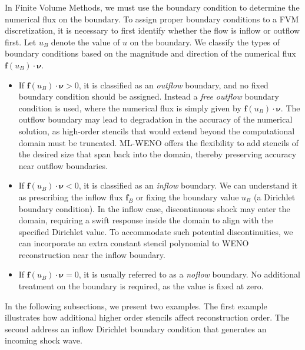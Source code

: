 In Finite Volume Methods, we must use the boundary condition to determine
the numerical flux on the boundary.
To assign proper boundary conditions to a FVM discretization, 
it is necessary to first identify
whether the flow is inflow or outflow first.
Let $u_B$ denote the value of $u$ on the boundary. We classify the
types of boundary conditions based on the magnitude and direction of the numerical
flux $\mathbf{f}(u_B)\cdot \pmb{\nu}$.
\begin{itemize}
		  \item If $\mathbf{f}(u_B)\cdot \pmb{\nu} >0$, it is classified as an 
					 \textit{outflow}
boundary, and no fixed boundary condition should be assigned. Instead a 
\textit{free outflow} boundary condition is used, where the 
numerical flux is simply given by $\mathbf{f}(u_B) \cdot 
\pmb{\nu}$. The outflow boundary may lead to degradation in the accuracy of the 
					 numerical solution, as high-order stencils that would extend beyond
					 the computational domain must be truncated.
					 ML-WENO offers the flexibility to add stencils of the desired 
					 size that span back into the domain, thereby preserving
					 accuracy near outflow boundaries.

\item If $\mathbf{f}(u_B)\cdot \pmb{\nu} < 0$, it is classified as an 
		  \textit{inflow}
		  boundary. We can understand it as prescribing the inflow flux $\mathbf{f}_B$ 
or fixing the boundary
value $u_B$ (a Dirichlet boundary condition).
In the inflow case, discontinuous shock may enter the domain, 
requiring a swift response inside the domain to align with the specified
Dirichlet value. To accommodate such potential discontinuities, 
we can incorporate an extra constant stencil polynomial 
to WENO reconstruction near the inflow boundary.

\item If $\mathbf{f}(u_B)\cdot \pmb{\nu} = 0$,  it is usually referred to
		  as a \textit{noflow} boundary. 
					 No additional treatment on the boundary is required, as
					 the value is fixed at zero.
\end{itemize}

In the following subsections, we present two examples. The first
example illustrates
how additional higher order stencils affect reconstruction order. 
The second address an inflow Dirichlet
boundary condition that generates an incoming shock wave.


